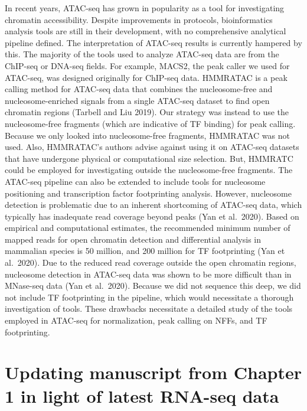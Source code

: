 \documentclass[12pt,twoside]{reedthesis}
\begin{document}
In recent years, ATAC-seq has grown in popularity as a tool for investigating chromatin accessibility. Despite improvements in protocols, bioinformatics analysis tools are still in their development, with no comprehensive analytical pipeline defined. The interpretation of ATAC-seq results is currently hampered by this. The majority of the tools used to analyze ATAC-seq data are from the ChIP-seq or DNA-seq fields. For example, MACS2, the peak caller we used for ATAC-seq, was designed originally for ChIP-seq data. HMMRATAC is a peak calling method for ATAC-seq data that combines the nucleosome-free and nucleosome-enriched signals from a single ATAC-seq dataset to find open chromatin regions (Tarbell and Liu 2019). Our strategy was instead to use the nucleosome-free fragments (which are indicative of TF binding) for peak calling. Because we only looked into nucleosome-free fragments, HMMRATAC was not used. Also, HMMRATAC's authors advise against using it on ATAC-seq datasets that have undergone physical or computational size selection. But, HMMRATC could be employed for investigating outside the nucleosome-free fragments.
The ATAC-seq pipeline can also be extended to include tools for nucleosome positioning and transcription factor footprinting analysis. However, nucleosome detection is problematic due to an inherent shortcoming of ATAC-seq data, which typically has inadequate read coverage beyond peaks (Yan et al.~2020). Based on empirical and computational estimates, the recommended minimum number of mapped reads for open chromatin detection and differential analysis in mammalian species is 50 million, and 200 million for TF footprinting (Yan et al.~2020). Due to the reduced read coverage outside the open chromatin regions, nucleosome detection in ATAC-seq data was shown to be more difficult than in MNase-seq data (Yan et al.~2020). Because we did not sequence this deep, we did not include TF footprinting in the pipeline, which would necessitate a thorough investigation of tools. These drawbacks necessitate a detailed study of the tools employed in ATAC-seq for normalization, peak calling on NFFs, and TF footprinting.

\hypertarget{updating-manuscript-from-chapter-1-in-light-of-latest-rna-seq-data}{%
\section*{Updating manuscript from Chapter 1 in light of latest RNA-seq data}\label{updating-manuscript-from-chapter-1-in-light-of-latest-rna-seq-data}}
\end{document}
